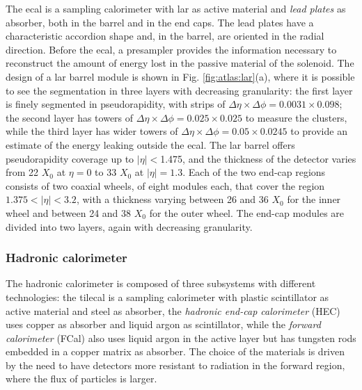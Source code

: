 The \gls{ecal} is a sampling calorimeter with \gls{lar} as active material and \textit{lead plates} as absorber, both in the barrel and in the end caps. The lead plates have a characteristic accordion shape and, in the barrel, are oriented in the radial direction. Before the \gls{ecal}, a presampler provides the information necessary to reconstruct the amount of energy lost in the passive material of the solenoid. The design of a \gls{lar} barrel module is shown in Fig. \ref{fig:atlas:lar}(a), where it is possible to see the segmentation in three layers with decreasing granularity: the first layer is finely segmented in pseudorapidity, with strips of $\Delta\eta \times \Delta\phi = 0.0031 \times 0.098$; the second layer has towers of $\Delta\eta \times \Delta\phi =  0.025 \times 0.025$ to measure the clusters, while the third layer has wider towers of $\Delta\eta \times \Delta\phi =  0.05 \times 0.0245$ to provide an estimate of the energy leaking outside the \gls{ecal}. The \gls{lar} barrel offers pseudorapidity coverage up to $|\eta|<$1.475, and the thickness of the detector varies from 22 $X_0$ at $\eta=0$ to 33 $X_0$ at $|\eta|=1.3$. 
Each of the two end-cap regions consists of two coaxial wheels, of eight modules each, that cover the region $1.375<|\eta|<3.2$, with a thickness varying between 26 and 36 $X_0$ for the inner wheel and between 24 and 38 $X_0$ for the outer wheel. The end-cap modules are divided into two layers, again with decreasing granularity.


\subsubsection*{Hadronic calorimeter}

The hadronic calorimeter is composed of three subsystems with different technologies: the \gls{tilecal} \cite{TileTDR} is a sampling calorimeter with plastic scintillator as active material and steel as absorber, the \textit{hadronic end-cap calorimeter} (HEC) uses copper as absorber and liquid argon as scintillator, while the \textit{forward calorimeter} (FCal) also uses liquid argon in the active layer but has tungsten rods embedded in a copper matrix as absorber. The choice of the materials is driven by the need to have detectors more resistant to radiation in the forward region, where the flux of particles is larger. 

